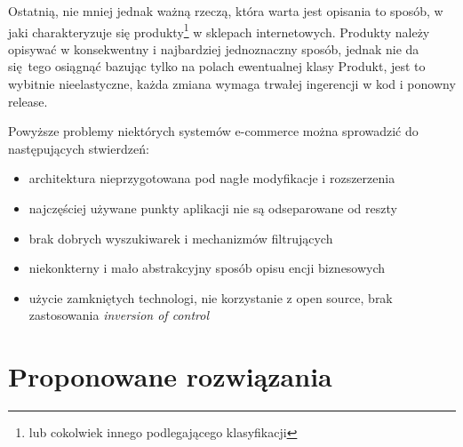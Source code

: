 Ostatnią, nie mniej jednak ważną rzeczą, która warta jest opisania to sposób, w jaki charakteryzuje się produkty\footnote{ lub cokolwiek innego podlegającego klasyfikacji} w sklepach internetowych. Produkty należy opisywać w konsekwentny i najbardziej jednoznaczny sposób, jednak nie da się tego osiągnąć bazując tylko na polach ewentualnej klasy Produkt, jest to wybitnie nieelastyczne, każda zmiana wymaga trwałej ingerencji w kod i ponowny release.

Powyższe problemy niektórych systemów e-commerce można sprowadzić do następujących stwierdzeń:
\begin{itemize}
	\item architektura nieprzygotowana pod nagłe modyfikacje i rozszerzenia
	\item najczęściej używane punkty aplikacji nie są odseparowane od reszty
	\item brak dobrych wyszukiwarek i mechanizmów filtrujących
	\item niekonkterny i mało abstrakcyjny sposób opisu encji biznesowych
	\item użycie zamkniętych technologi, nie korzystanie z open source, brak zastosowania \textit{inversion of control}
\end{itemize}

\section{Proponowane rozwiązania}







